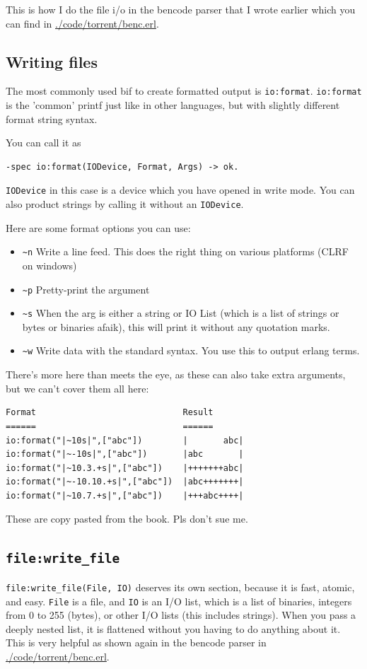 \documentclass[11pt]{article}
\begin{document}
This is how I do the file i/o in the bencode parser that I wrote
earlier which you can find in \url{./code/torrent/benc.erl}.


\subsection{Writing files}
\label{sec:org3857c47}
The most commonly used bif to create formatted output is
\texttt{io:format}. \texttt{io:format} is the 'common' printf just like in other
languages, but with slightly different format string syntax.

You can call it as
\begin{verbatim}
-spec io:format(IODevice, Format, Args) -> ok.
\end{verbatim}
\texttt{IODevice} in this case is a device which you have opened in write
mode. You can also product strings by calling it without an
\texttt{IODevice}.

Here are some format options you can use:
\begin{itemize}
\item \texttt{\textasciitilde{}n} Write a line feed. This does the right thing on various
platforms (CLRF on windows)
\item \texttt{\textasciitilde{}p} Pretty-print the argument
\item \texttt{\textasciitilde{}s} When the arg is either a string or IO List (which is a
list of strings or bytes or binaries afaik), this will print it
without any quotation marks.
\item \texttt{\textasciitilde{}w} Write data with the standard syntax. You use this to output
erlang terms.
\end{itemize}

There's more here than meets the eye, as these can also take extra
arguments, but we can't cover them all here:
\begin{verbatim}
Format                             Result
======                             ======
io:format("|~10s|",["abc"])        |       abc|
io:format("|~-10s|",["abc"])       |abc       |
io:format("|~10.3.+s|",["abc"])    |+++++++abc|
io:format("|~-10.10.+s|",["abc"])  |abc+++++++|
io:format("|~10.7.+s|",["abc"])    |+++abc++++|
\end{verbatim}
These are copy pasted from the book. Pls don't sue me.

\subsection{\texttt{file:write\_file}}
\label{sec:org196bdc1}
\texttt{file:write\_file(File, IO)} deserves its own section, because it is
fast, atomic, and easy. \texttt{File} is a file, and \texttt{IO} is an I/O list,
which is a list of binaries, integers from 0 to 255 (bytes), or
other I/O lists (this includes strings). When you pass a deeply
nested list, it is flattened without you having to do anything
about it. This is very helpful as shown again in the bencode parser
in \url{./code/torrent/benc.erl}.
\end{document}
